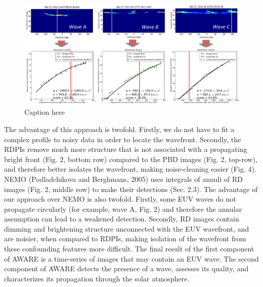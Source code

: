 \begin{figure}
\begin{center}
\includegraphics[width=16cm]{aware_velocity_figure_v3.pdf}
\caption{Caption here}
\end{center}
\end{figure}

The advantage of this approach is twofold. Firstly, we do not have to fit a complex profile to noisy data in order to locate the wavefront. Secondly, the RDPIs remove much more structure that is not associated with a propagating bright front (Fig. 2, bottom row) compared to the PBD images (Fig. 2, top-row), and therefore better isolates the wavefront, making noise-cleaning easier (Fig. 4).  NEMO (Podladchikova and Berghmans, 2005) uses integrals of annuli of RD images (Fig. 2, middle row) to make their detections (Sec. 2.3).  The advantage of our approach over NEMO is also twofold.  Firstly, some EUV waves do not propagate circularly (for example, wave A, Fig. 2) and therefore the annular assumption can lead to a weakened detection.  Secondly, RD images contain dimming and brightening structure unconnected with the EUV wavefront, and are noisier,  when compared to RDPIs, making isolation of the wavefront from these confounding features more difficult. The final result of the first component of AWARE is a time-series of images that may contain an EUV wave.  The second component of AWARE detects the presence of a wave, assesses its quality, and characterizes its propagation through the solar atmosphere.

